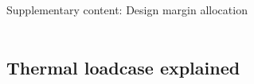 \begin{frame}[c,noframenumbering]
	\centering
	\begin{titleblock}{}
		~\\%
		{\centering\LARGE Supplementary content: Design margin allocation\\}%
		~\\%
	\end{titleblock}
\end{frame}
\subsection{Thermal loadcase explained}
